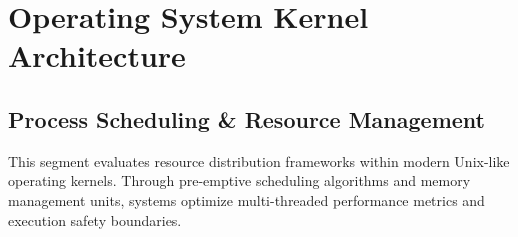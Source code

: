 \section{Operating System Kernel Architecture}
\subsection{Process Scheduling \& Resource Management}
This segment evaluates resource distribution frameworks within modern Unix-like operating kernels. 
Through pre-emptive scheduling algorithms and memory management units, systems optimize 
multi-threaded performance metrics and execution safety boundaries.
